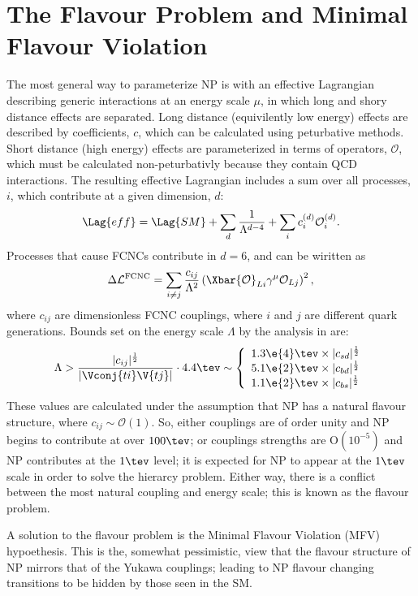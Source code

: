 \section{The Flavour Problem and Minimal Flavour Violation}

The most general way to parameterize NP is with an effective Lagrangian describing generic
interactions at an energy scale $\mu$, in which long and shory distance effects are separated.
Long distance (equivilently low energy) effects are described by coefficients, $c$, which can be
calculated using peturbative methods.
Short distance (high energy) effects are parameterized in terms of operators, $\mathcal{O}$,
which must be calculated non-peturbativly because they contain QCD interactions.
The resulting effective Lagrangian includes a sum over all processes, $i$, which contribute at a
given dimension, $d$:
\begin{equation}
  \Lag{eff}
  =
  \Lag{SM} + \sum_d\frac1{\Lambda^{d-4}}
  + \sum_ic_i^{(d)}\mathcal{O}_i^{(d)}.
\end{equation}
Processes that cause FCNCs contribute in $d=6$, and can be wiritten as
\begin{equation}
  \Delta\mathcal{L}^\mathrm{FCNC}
  =
  \sum_{i\neq j}\frac{c_{ij}}{\Lambda^2}
  \left(\Xbar{\mathcal{O}}_{Li}\gamma^\mu\mathcal{O}_{Lj}\right)^2,
\end{equation}
where $c_{ij}$ are dimensionless FCNC couplings, where $i$ and $j$ are different quark generations.
Bounds set on the energy scale $\Lambda$ by the analysis in  are:
\begin{equation}
  \Lambda > \frac{|c_{ij}|^\frac12}{|\Vconj{ti}\V{tj}|}\cdot4.4\tev
  \sim
  \left\{
    \begin{array}{l}
      1.3\e{4}\tev\times |c_{sd}|^\frac12 \\
      5.1\e{2}\tev\times |c_{bd}|^\frac12 \\
      1.1\e{2}\tev\times |c_{bs}|^\frac12 \\
    \end{array}\right.
\end{equation}
These values are calculated under the assumption that NP has a natural flavour structure, where
$c_{ij}\sim\mathcal{O}(1)$.
So, either couplings are of order unity and NP begins to contribute at over $100\tev$; or couplings
strengths are $\mathrm{O}(10^{-5})$ and NP contributes at the $1\tev$ level;
it is expected for NP to appear at the $1\tev$ scale in order to solve the hierarcy problem.
Either way, there is a conflict between the most natural coupling and energy scale; this is known
as the flavour problem.

A solution to the flavour problem is the Minimal Flavour Violation (MFV) hypoethesis.
This is the, somewhat pessimistic, view that the flavour structure of NP mirrors that of the Yukawa
couplings; leading to NP flavour changing transitions to be hidden by those seen in the SM.



